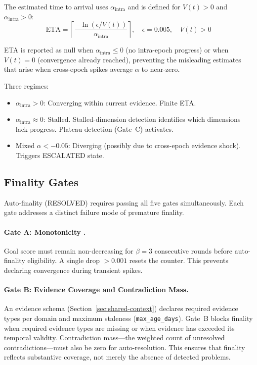\documentclass[11pt]{article}
\begin{document}
The estimated time to arrival uses $\alpha_{\text{intra}}$ and is defined for $V(t) > 0$ and $\alpha_{\text{intra}} > 0$:
\[
\text{ETA} = \left\lceil \frac{-\ln(\epsilon / V(t))}{\alpha_{\text{intra}}} \right\rceil, \quad \epsilon = 0.005, \quad V(t) > 0
\]

ETA is reported as null when $\alpha_{\text{intra}} \leq 0$ (no intra-epoch progress) or when $V(t) = 0$ (convergence already reached), preventing the misleading estimates that arise when cross-epoch spikes average $\alpha$ to near-zero.

Three regimes:
\begin{itemize}
  \item $\alpha_{\text{intra}} > 0$: Converging within current evidence. Finite ETA.
  \item $\alpha_{\text{intra}} \approx 0$: Stalled. Stalled-dimension detection identifies which dimensions lack progress. Plateau detection (Gate~C) activates.
  \item Mixed $\alpha < -0.05$: Diverging (possibly due to cross-epoch evidence shock). Triggers ESCALATED state.
\end{itemize}

\subsection{Finality Gates}
\label{sec:finality-gates}

Auto-finality (RESOLVED) requires passing all five gates simultaneously. Each gate addresses a distinct failure mode of premature finality.

\paragraph{Gate A: Monotonicity \cite{ruan2025}.}
Goal score must remain non-decreasing for $\beta = 3$ consecutive rounds before auto-finality eligibility. A single drop $> 0.001$ resets the counter. This prevents declaring convergence during transient spikes.

\paragraph{Gate B: Evidence Coverage and Contradiction Mass.}
An evidence schema (Section~\ref{sec:shared-context}) declares required evidence types per domain and maximum staleness (\texttt{max\_age\_days}). Gate~B blocks finality when required evidence types are missing or when evidence has exceeded its temporal validity. Contradiction mass---the weighted count of unresolved contradictions---must also be zero for auto-resolution. This ensures that finality reflects substantive coverage, not merely the absence of detected problems.
\end{document}
